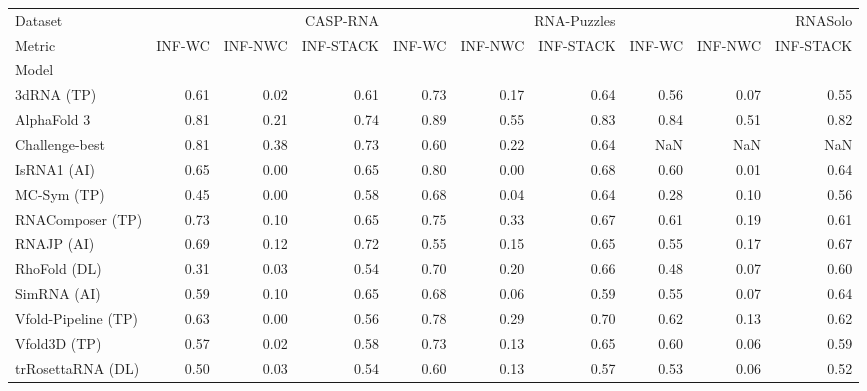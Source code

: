 \begin{tabular}{lrrrrrrrrr}
\toprule
Dataset & \multicolumn{3}{r}{CASP-RNA} & \multicolumn{3}{r}{RNA-Puzzles} & \multicolumn{3}{r}{RNASolo} \\
Metric & INF-WC & INF-NWC & INF-STACK & INF-WC & INF-NWC & INF-STACK & INF-WC & INF-NWC & INF-STACK \\
Model &  &  &  &  &  &  &  &  &  \\
\midrule
3dRNA (TP) & 0.61 & 0.02 & 0.61 & 0.73 & 0.17 & 0.64 & 0.56 & 0.07 & 0.55 \\
AlphaFold 3 & 0.81 & 0.21 & 0.74 & 0.89 & 0.55 & 0.83 & 0.84 & 0.51 & 0.82 \\
Challenge-best & 0.81 & 0.38 & 0.73 & 0.60 & 0.22 & 0.64 & NaN & NaN & NaN \\
IsRNA1 (AI) & 0.65 & 0.00 & 0.65 & 0.80 & 0.00 & 0.68 & 0.60 & 0.01 & 0.64 \\
MC-Sym (TP) & 0.45 & 0.00 & 0.58 & 0.68 & 0.04 & 0.64 & 0.28 & 0.10 & 0.56 \\
RNAComposer (TP) & 0.73 & 0.10 & 0.65 & 0.75 & 0.33 & 0.67 & 0.61 & 0.19 & 0.61 \\
RNAJP (AI) & 0.69 & 0.12 & 0.72 & 0.55 & 0.15 & 0.65 & 0.55 & 0.17 & 0.67 \\
RhoFold (DL) & 0.31 & 0.03 & 0.54 & 0.70 & 0.20 & 0.66 & 0.48 & 0.07 & 0.60 \\
SimRNA (AI) & 0.59 & 0.10 & 0.65 & 0.68 & 0.06 & 0.59 & 0.55 & 0.07 & 0.64 \\
Vfold-Pipeline (TP) & 0.63 & 0.00 & 0.56 & 0.78 & 0.29 & 0.70 & 0.62 & 0.13 & 0.62 \\
Vfold3D (TP) & 0.57 & 0.02 & 0.58 & 0.73 & 0.13 & 0.65 & 0.60 & 0.06 & 0.59 \\
trRosettaRNA (DL) & 0.50 & 0.03 & 0.54 & 0.60 & 0.13 & 0.57 & 0.53 & 0.06 & 0.52 \\
\bottomrule
\end{tabular}
